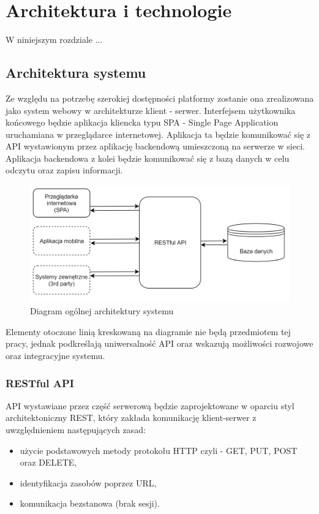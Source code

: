 \chapter{Architektura i technologie}

W niniejszym rozdziale ...

\section{Architektura systemu}

Ze względu na potrzebę szerokiej dostępności platformy zostanie ona zrealizowana jako system webowy w architekturze klient - serwer. Interfejsem użytkownika końcowego będzie aplikacja kliencka typu SPA - Single Page Application uruchamiana w przeglądarce internetowej. Aplikacja ta będzie komunikować się z API wystawionym przez aplikację backendową umieszczoną na serwerze w sieci.  Aplikacja backendowa z kolei będzie komunikować się z bazą danych w celu odczytu oraz zapisu informacji. 

\begin{figure}[ht]
\centering
\includegraphics[width=0.8\linewidth]{05-architektura-i-technologie/rys/ogolna-architektura.PNG}
\caption{Diagram ogólnej architektury systemu}
\label{fig:diagram-og-architekt}
\end{figure}

Elementy otoczone linią kreskowaną na diagramie nie będą przedmiotem tej pracy, jednak podkreślają uniwersalność API oraz wskazują możliwości rozwojowe oraz integracyjne systemu.

\subsection{RESTful API}
API wystawiane przez część serwerową będzie zaprojektowane w oparciu styl architektoniczny REST, który zakłada komunikację klient-serwer z uwzględnieniem następujących zasad: 
\begin{itemize}
\item użycie podstawowych metody protokołu HTTP czyli - GET, PUT, POST oraz DELETE,
\item identyfikacja zasobów poprzez URL,
\item komunikacja bezstanowa (brak sesji).
\end{itemize}

